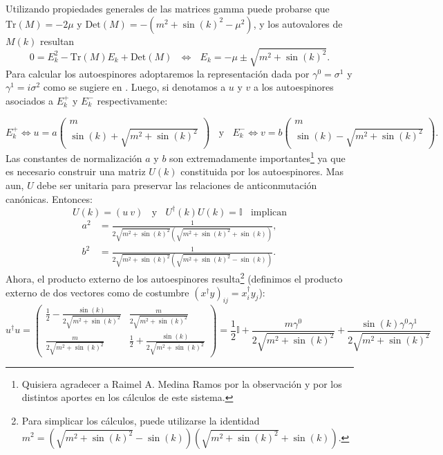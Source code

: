Utilizando propiedades generales de las matrices gamma puede probarse que $\text{Tr}(M)=-2\mu$ y $\text{Det}(M)=-(m^2+\sin(k)^2-\mu^2)$, y los autovalores de $M(k)$ resultan
\begin{equation}
0=E_k^2-\text{Tr}(M)E_k+\text{Det}(M)\:\:\:\Leftrightarrow\:\:\: E_k=-\mu\pm \sqrt{m^2+\sin(k)^2}.
\end{equation}
Para calcular los autoespinores adoptaremos la representación dada por $\gamma^0=\sigma^1$ y $\gamma^1=i\sigma^2$ como se sugiere en \cite{Casini:2009sr}.
Luego, si denotamos a $u$ y $v$ a los autoespinores asociados a $E_k^+$ y $E_k^-$ respectivamente:

\begin{equation}
E_k^+ \Leftrightarrow u=a\begin{pmatrix}
m \\ \sin(k)+\sqrt{m^2+\sin(k)^2}
\end{pmatrix}\:\:\:\: \text{y}  \:\:\:\: E_k^- \Leftrightarrow v=b \begin{pmatrix}
m \\ \sin(k)-\sqrt{m^2+\sin(k)^2}
\end{pmatrix}.
\end{equation}
Las constantes de normalización $a$ y $b$ son extremadamente importantes\footnote{Quisiera agradecer a Raimel A. Medina Ramos por la observación y por los distintos aportes en los cálculos de este sistema.} ya que es necesario construir una matriz $U(k)$ constituida por los autoespinores. Mas aun, $U$ debe ser unitaria para preservar las relaciones de anticonmutación canónicas. Entonces:
\begin{equation}
U(k)=\left(u\: v\right)\:\:\:\: \text{y}\:\:\:\:  U^{\dag}(k)U(k)=\mathbb{I}\:\:\:\: 
 \text{implican}
\end{equation}
\begin{equation}
\begin{split}
a^2 & =\frac{1}{2\sqrt{m^2+\sin(k)^2}(\sqrt{m^2+\sin(k)^2}+\sin(k))}, \\ b^2 & =\frac{1}{2\sqrt{m^2+\sin(k)^2}(\sqrt{m^2+\sin(k)^2}-\sin(k))}.
\end{split}
\end{equation}
Ahora, el producto externo de los autoespinores resulta\footnote{Para simplicar los cálculos, puede utilizarse la identidad $m^2=(\sqrt{m^2+\sin(k)^2}-\sin(k))(\sqrt{m^2+\sin(k)^2}+\sin(k))$.} (definimos el producto externo de dos vectores como de costumbre $(x^{\dag}y)_{ij}=x^{\dag}_iy_j$):
\begin{equation}
u^{\dag}u=\begin{pmatrix}
\frac{1}{2}-\frac{\sin(k)}{2\sqrt{m^2+\sin(k)^2}} & \frac{m}{2\sqrt{m^2+\sin(k)^2}} \\ \frac{m}{2\sqrt{m^2+\sin(k)^2}} & \frac{1}{2}+\frac{\sin(k)}{2\sqrt{m^2+\sin(k)^2}}
\end{pmatrix} = \frac{1}{2}\mathbb{I}+\frac{m\gamma^0}{2\sqrt{m^2+\sin(k)^2}}+\frac{\sin(k)\gamma^0\gamma^1}{2\sqrt{m^2+\sin(k)^2}}
\end{equation}
